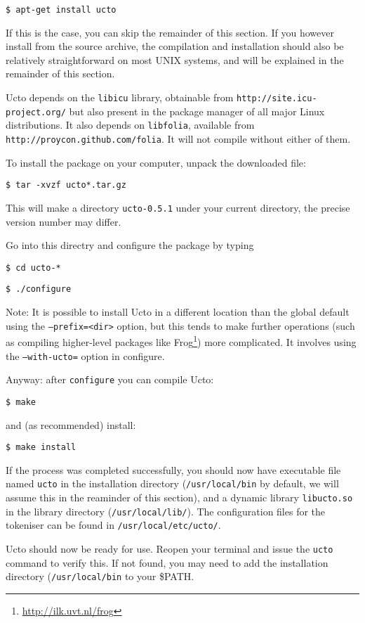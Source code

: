 \documentclass[a4paper,12pt]{report}
\begin{document}
{\tt \$ apt-get install ucto}    

If this is the case, you can skip the remainder of this section. If you however install from the source archive, the compilation and installation should also be relatively straightforward on most UNIX systems, and will be explained in the remainder of this section. 

Ucto depends on the \texttt{libicu} library, obtainable from {\tt http://site.icu-project.org/} but also present in the package manager of all major Linux distributions. It also depends on \texttt{libfolia}, available from \texttt{http://proycon.github.com/folia}. It will not compile without either of them.

To install the package on your computer, unpack the downloaded file:

{\tt \$ tar -xvzf ucto*.tar.gz}

This will make a directory {\tt ucto-0.5.1} under your current directory, the precise version number may differ.

Go into this directry and configure the package by typing

{\tt \$ cd ucto-*}

{\tt \$ ./configure}


Note: It is possible to install Ucto in a different location than the global default using the \texttt{--prefix=<dir>} option, but this tends to make further operations (such as compiling higher-level packages like Frog\footnote{\url{http://ilk.uvt.nl/frog}}) more complicated. It involves using the {\tt --with-ucto=} option in configure. 
 
Anyway: after {\tt configure} you can compile Ucto:

{\tt \$ make}

and (as recommended) install:

{\tt \$ make install }

If the process was completed successfully, you should now have
executable file named {\tt ucto} in the installation directory
({\tt /usr/local/bin} by default, we will assume this in the reaminder of this section), and a dynamic library {\tt libucto.so} in
the library directory ({\tt /usr/local/lib/}). The configuration files for the tokeniser can be found in {\tt /usr/local/etc/ucto/}.

Ucto should now be ready for use. Reopen your terminal and issue the {\tt ucto} command to verify this. If not found, you may need to add the installation directory ({\tt /usr/local/bin} to your \$PATH. 
\end{document}
